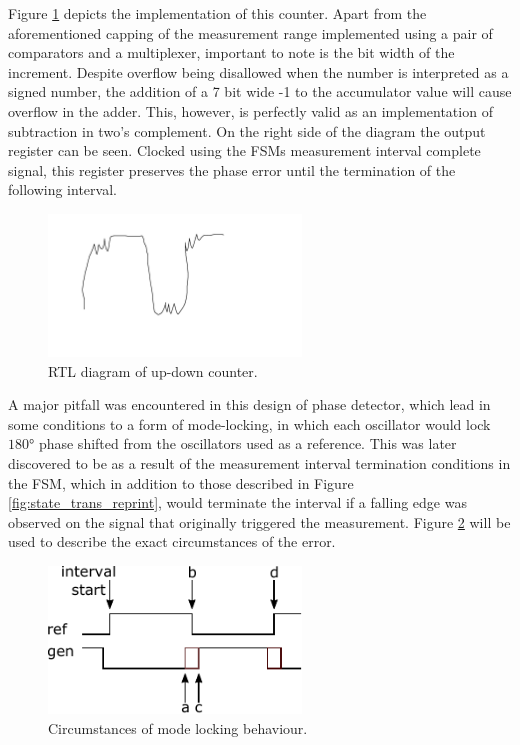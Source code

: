 Figure \ref{fig:updown_ctr} depicts the implementation of this counter. Apart from the aforementioned capping of the measurement range implemented using a pair of comparators and a multiplexer, important to note is the bit width of the increment. Despite overflow being disallowed when the number is interpreted as a signed number, the addition of a 7 bit wide -1 to the accumulator value will cause overflow in the adder. This, however, is perfectly valid as an implementation of subtraction in two's complement. On the right side of the diagram the output register can be seen. Clocked using the \ac{FSM}s measurement interval complete signal, this register preserves the phase error until the termination of the following interval.
\begin{figure}[h]
	\centering
	\includegraphics[width=0.6\textwidth]{../bad_waveform}
	\caption[\ac{RTL} diagram of up-down counter]{\ac{RTL} diagram of up-down counter.}
	\label{fig:updown_ctr}
\end{figure}

A major pitfall was encountered in this design of phase detector, which lead in some conditions to a form of mode-locking, in which each oscillator would lock $180\si{\degree}$ phase shifted from the oscillators used as a reference. This was later discovered to be as a result of the measurement interval termination conditions in the \ac{FSM}, which in addition to those described in Figure \ref{fig:state_trans_reprint}, would terminate the interval if a falling edge was observed on the signal that originally triggered the measurement. Figure \ref{fig:uncertainty} will be used to describe the exact circumstances of the error.
\begin{figure}[h]
	\centering
	\includegraphics[width=0.6\textwidth]{../uncertain}
	\caption[Circumstances of mode locking behaviour]{Circumstances of mode locking behaviour.}
	\label{fig:uncertainty}
\end{figure}


